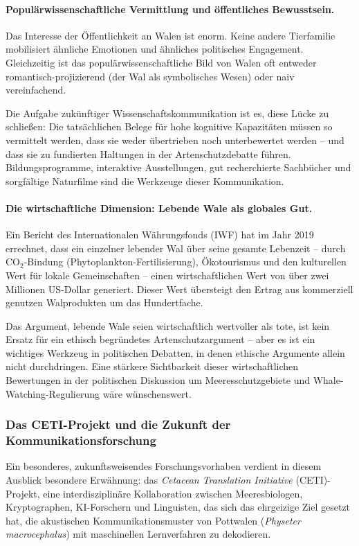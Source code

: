 ﻿\documentclass[12pt,a4paper]{article}
\theoremstyle{definition}
\theoremstyle{remark}
\begin{document}
\paragraph{Populärwissenschaftliche Vermittlung und öffentliches Bewusstsein.}
Das Interesse der Öffentlichkeit an Walen ist enorm. Keine andere Tierfamilie mobilisiert ähnliche Emotionen und ähnliches politisches Engagement. Gleichzeitig ist das populärwissenschaftliche Bild von Walen oft entweder romantisch-projizierend (der Wal als symbolisches Wesen) oder naiv vereinfachend.

Die Aufgabe zukünftiger Wissenschaftskommunikation ist es, diese Lücke zu schließen: Die tatsächlichen Belege für hohe kognitive Kapazitäten müssen so vermittelt werden, dass sie weder übertrieben noch unterbewertet werden -- und dass sie zu fundierten Haltungen in der Artenschutzdebatte führen. Bildungsprogramme, interaktive Ausstellungen, gut recherchierte Sachbücher und sorgfältige Naturfilme sind die Werkzeuge dieser Kommunikation.

\paragraph{Die wirtschaftliche Dimension: Lebende Wale als globales Gut.}
Ein Bericht des Internationalen Währungsfonds (IWF) hat im Jahr 2019 errechnet, dass ein einzelner lebender Wal über seine gesamte Lebenzeit -- durch CO$_2$-Bindung (Phytoplankton-Fertilisierung), Ökotourismus und den kulturellen Wert für lokale Gemeinschaften -- einen wirtschaftlichen Wert von über zwei Millionen US-Dollar generiert. Dieser Wert übersteigt den Ertrag aus kommerziell genutzen Walprodukten um das Hundertfache.

Das Argument, lebende Wale seien wirtschaftlich wertvoller als tote, ist kein Ersatz für ein ethisch begründetes Artenschutzargument -- aber es ist ein wichtiges Werkzeug in politischen Debatten, in denen ethische Argumente allein nicht durchdringen. Eine stärkere Sichtbarkeit dieser wirtschaftlichen Bewertungen in der politischen Diskussion um Meeresschutzgebiete und Whale-Watching-Regulierung wäre wünschenswert.

\subsubsection{Das CETI-Projekt und die Zukunft der Kommunikationsforschung}

Ein besonderes, zukunftsweisendes Forschungsvorhaben verdient in diesem Ausblick besondere Erwähnung: das \emph{Cetacean Translation Initiative} (CETI)-Projekt, eine interdisziplinäre Kollaboration zwischen Meeresbiologen, Kryptographen, KI-Forschern und Linguisten, das sich das ehrgeizige Ziel gesetzt hat, die akustischen Kommunikationsmuster von Pottwalen (\textit{Physeter macrocephalus}) mit maschinellen Lernverfahren zu dekodieren.
\end{document}
